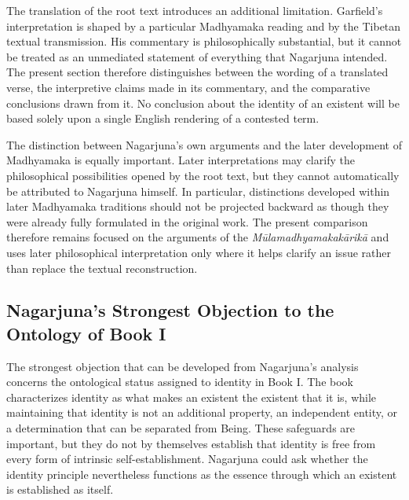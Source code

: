 \label{para:VS.B01.P01.C08.S18.SS13.P002}
The translation of the root text introduces an additional limitation. Garfield's interpretation is shaped by a particular Madhyamaka reading and by the Tibetan textual transmission. His commentary is philosophically substantial, but it cannot be treated as an unmediated statement of everything that Nagarjuna intended. The present section therefore distinguishes between the wording of a translated verse, the interpretive claims made in its commentary, and the comparative conclusions drawn from it. No conclusion about the identity of an existent will be based solely upon a single English rendering of a contested term.

\label{para:VS.B01.P01.C08.S18.SS13.P003}
The distinction between Nagarjuna's own arguments and the later development of Madhyamaka is equally important. Later interpretations may clarify the philosophical possibilities opened by the root text, but they cannot automatically be attributed to Nagarjuna himself. In particular, distinctions developed within later Madhyamaka traditions should not be projected backward as though they were already fully formulated in the original work. The present comparison therefore remains focused on the arguments of the \emph{M\={u}lamadhyamakak\={a}rik\={a}} and uses later philosophical interpretation only where it helps clarify an issue rather than replace the textual reconstruction.

\subsection{Nagarjuna's Strongest Objection to the Ontology of Book I}
\label{subsec:ch08_s18_ss14}

\label{para:VS.B01.P01.C08.S18.SS14.P001}
The strongest objection that can be developed from Nagarjuna's analysis concerns the ontological status assigned to identity in Book I. The book characterizes identity as what makes an existent the existent that it is, while maintaining that identity is not an additional property, an independent entity, or a determination that can be separated from Being. These safeguards are important, but they do not by themselves establish that identity is free from every form of intrinsic self-establishment. Nagarjuna could ask whether the identity principle nevertheless functions as the essence through which an existent is established as itself.

